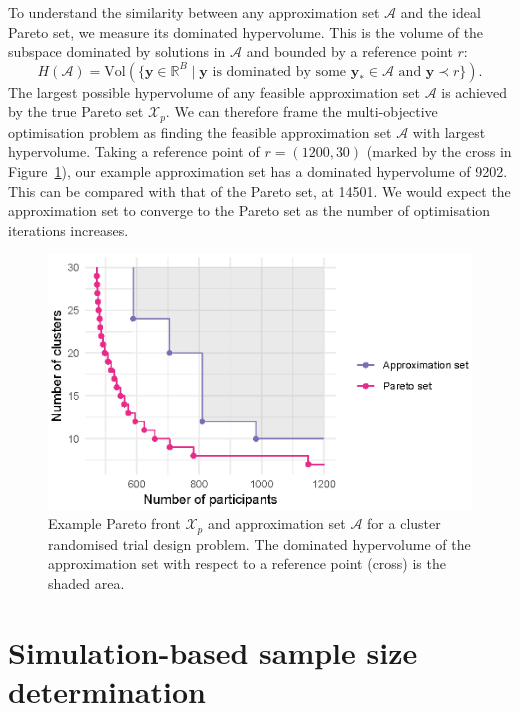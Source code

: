 \documentclass{article}
\begin{document}
To understand the similarity between any approximation set $\mathcal{A}$ and the ideal Pareto set, we measure its dominated hypervolume. This is the volume of the subspace dominated by solutions in $\mathcal{A}$ and bounded by a reference point $r$:
\begin{equation}
H(\mathcal{A}) = \text{Vol}(\{\mathbf{y} \in \mathbb{R}^{B} \mid \mathbf{y} \text{ is dominated by some } \mathbf{y}_{*} \in \mathcal{A} \text{ and } \mathbf{y} \prec r \}). 
\end{equation}
The largest possible hypervolume of any feasible approximation set $\mathcal{A}$ is achieved by the true Pareto set $\mathcal{X}_{p}$. We can therefore frame the multi-objective optimisation problem as finding the feasible approximation set $\mathcal{A}$ with largest hypervolume. Taking a reference point of $r = (1200, 30)$ (marked by the cross in Figure~\ref{fig:fake_pareto}), our example approximation set has a dominated hypervolume of 9202. This can be compared with that of the Pareto set, at 14501. We would expect the approximation set to converge to the Pareto set as the number of optimisation iterations increases.

\begin{figure}
\centering
\includegraphics[scale=0.8]{fake_pareto}
\caption{Example Pareto front $\mathcal{X}_{p}$ and approximation set $\mathcal{A}$ for a cluster randomised trial design problem. The dominated hypervolume of the approximation set with respect to a reference point (cross) is the shaded area.}
\label{fig:fake_pareto}
\end{figure}


\section{Simulation-based sample size determination}\label{sec:methods}
\end{document}
